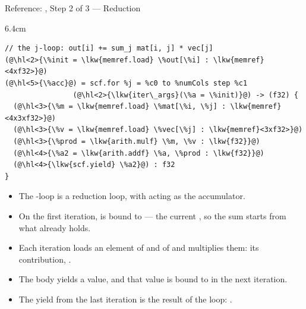 \documentclass[aspectratio=169,10pt]{beamer}
\begin{document}
\begin{frame}[fragile]{Reference: , Step 2 of 3 --- Reduction}
  \begin{stage}{6.4cm}
\begin{lstlisting}[language=mlir]
// the j-loop: out[i] += sum_j mat[i, j] * vec[j]
(@\hl<2>{\%init = \lkw{memref.load} \%out[\%i] : \lkw{memref}<4xf32>}@)
(@\hl<5>{\%acc}@) = scf.for %j = %c0 to %numCols step %c1
                (@\hl<2>{\lkw{iter\_args}(\%a = \%init)}@) -> (f32) {
  (@\hl<3>{\%m = \lkw{memref.load} \%mat[\%i, \%j] : \lkw{memref}<4x3xf32>}@)
  (@\hl<3>{\%v = \lkw{memref.load} \%vec[\%j] : \lkw{memref}<3xf32>}@)
  (@\hl<3>{\%prod = \lkw{arith.mulf} \%m, \%v : \lkw{f32}}@)
  (@\hl<4>{\%a2 = \lkw{arith.addf} \%a, \%prod : \lkw{f32}}@)
  (@\hl<4>{\lkw{scf.yield} \%a2}@) : f32
}
\end{lstlisting}
  \vspace{0.2em}
  \begin{itemize}\setlength{\itemsep}{0pt}
    \item The -loop is a \alert{reduction} loop, with  acting
      as the accumulator.
    \item<2-> On the \alert{first iteration},  is bound to
       --- the current , so the sum starts from what
       already holds.
    \item<3-> Each iteration \alert{loads} an element of  and of
       and multiplies them: its contribution, .
    \item<4-> The body \alert{yields} a value, and that value is bound to
       in the \alert{next iteration}.
    \item<5-> The yield from the \alert{last iteration} is the result of the
      loop: .
  \end{itemize}
  \end{stage}
\end{frame}
\end{document}

